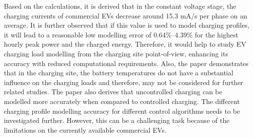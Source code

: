 	Based on the calculations, it is derived that in the constant voltage stage, the charging currents of commercial EVs decrease around 15.3 mA/s per phase on an average. It is further observed that if this value is used to model charging profiles, it will lead to a reasonable low modelling error of 0.64\%–4.39\% for the highest hourly peak power and the charged energy. 
	Therefore, it would help to study EV charging load modelling from the charging site point-of-view, enhancing its accuracy with reduced computational requirements. Also, the paper demonstrates that in the charging site, the battery temperatures do not have a substantial influence on the charging loads and therefore, may not be considered for further related studies.
	The paper also derives that uncontrolled charging can be modelled more accurately when compared to  controlled charging. The different charging profile modelling  accuracy for different control algorithms needs to be investigated further. However, this can be a challenging task because of the limitations on the currently available commercial EVs. 
	